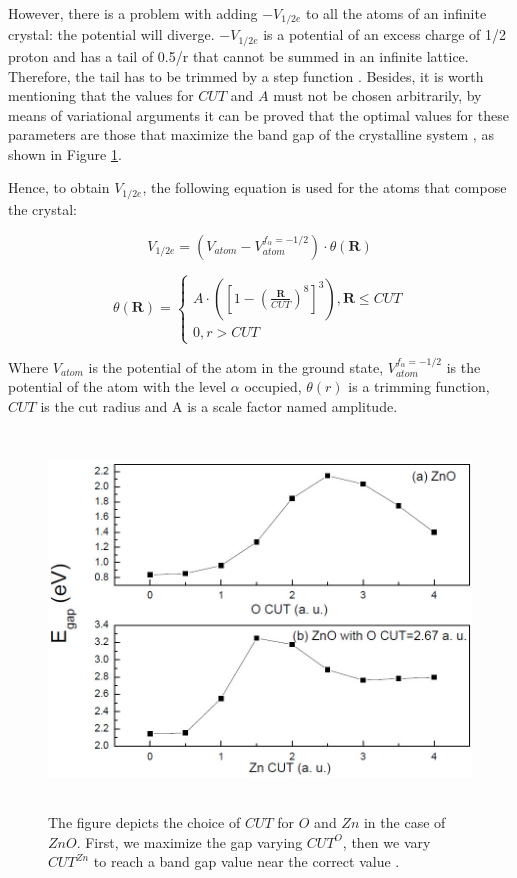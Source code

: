 However, there is a problem with adding $-V_ {1 / 2e}$ to all the atoms of an infinite crystal: the potential will diverge. $-V_ {1 / 2e}$ is a potential of an excess charge of 1/2 proton and has a tail of 0.5/r
that cannot be summed in an infinite lattice. Therefore, the tail has to be trimmed by a step function \cite{doi:10.1063/1.3624562}. Besides, it is worth mentioning that the values for $CUT$ and $A$ must not be chosen arbitrarily, by means of variational  arguments it can be proved that the optimal values for these parameters are those that maximize the band gap of the crystalline system \cite{PhysRevB.78.125116} \cite{doi:10.1063/1.3624562},
as shown in Figure \ref{cut-gap}.

Hence, to obtain $V_ {1 / 2e}$, the following equation is used for the atoms that compose the crystal:

\begin{equation}
\label{cut_eq}
 V_{1/2e} = \left(V_{atom} - V_{atom}^{f_{\alpha}=-1/2}\right)\cdot \theta (\mathbf{R})   
\end{equation}

\begin{equation}
\label{cut_eq_2}
       \theta (\mathbf{R}) = \left\{\begin{matrix}
    A \cdot\left( \left[1-\left(\frac{\mathbf{R}}{CUT}\right)^{8}\right]^{3}\right) , \mathbf{R} \leq CUT \\
    0, r > CUT
   \end{matrix}\right.
\end{equation}

Where $V_{atom}$ is the potential of the atom in the ground state, $V_{atom}^{f_{\alpha}=-1/2}$
is the potential of the atom with the level $\alpha$ occupied, $\theta (r)$ is a trimming function,
$CUT$ is the cut radius  and A is a scale factor named amplitude.
\begin{figure}[!ht]
        \centering
        \includegraphics[width=13cm,height=10cm]{images/cut_gap.png}
        \caption{The figure depicts the choice of $CUT$ for $O$ and $Zn$ in the case of $ZnO$. First, we maximize the gap varying $CUT^{O}$, then we vary $CUT^{Zn}$ to reach a band gap value near the correct value \cite{doi:10.1063/1.3624562}.}
        \label{cut-gap}
\end{figure}


